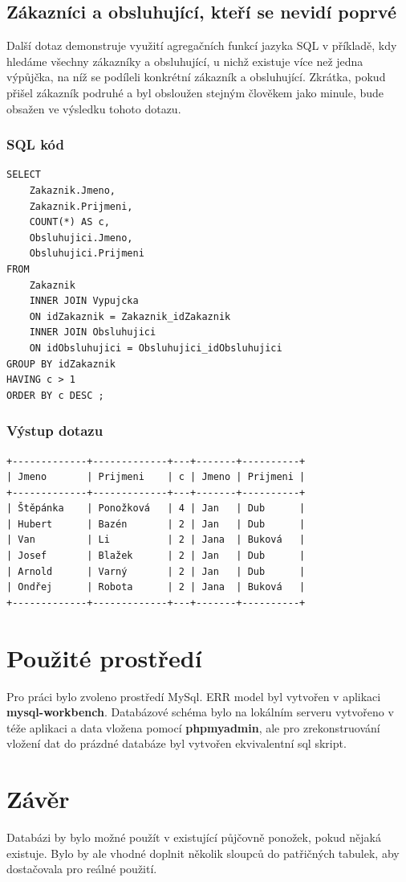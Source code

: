 \documentclass[titlepage]{article}
\begin{document}
\subsection{Zákazníci a obsluhující, kteří se nevidí poprvé}
Další dotaz demonstruje využití agregačních funkcí jazyka SQL v příkladě, kdy
hledáme všechny zákazníky a obsluhující, u nichž existuje více než jedna
výpůjčka, na níž se podíleli konkrétní zákazník a obsluhující. Zkrátka, pokud
přišel zákazník podruhé a byl obsloužen stejným člověkem jako minule, bude
obsažen ve výsledku tohoto dotazu.

\subsubsection{SQL kód}
\begin{verbatim}
SELECT 
	Zakaznik.Jmeno, 
	Zakaznik.Prijmeni, 
	COUNT(*) AS c, 
	Obsluhujici.Jmeno, 
	Obsluhujici.Prijmeni 
FROM 
	Zakaznik 
	INNER JOIN Vypujcka 
	ON idZakaznik = Zakaznik_idZakaznik 
	INNER JOIN Obsluhujici 
	ON idObsluhujici = Obsluhujici_idObsluhujici 
GROUP BY idZakaznik 
HAVING c > 1
ORDER BY c DESC ;
\end{verbatim}

\subsubsection{Výstup dotazu}
\begin{verbatim}
+-------------+-------------+---+-------+----------+
| Jmeno       | Prijmeni    | c | Jmeno | Prijmeni |
+-------------+-------------+---+-------+----------+
| Štěpánka    | Ponožková   | 4 | Jan   | Dub      |
| Hubert      | Bazén       | 2 | Jan   | Dub      |
| Van         | Li          | 2 | Jana  | Buková   |
| Josef       | Blažek      | 2 | Jan   | Dub      |
| Arnold      | Varný       | 2 | Jan   | Dub      |
| Ondřej      | Robota      | 2 | Jana  | Buková   |
+-------------+-------------+---+-------+----------+
\end{verbatim}


\clearpage
\section{Použité prostředí}
Pro práci bylo zvoleno prostředí MySql. ERR model byl vytvořen v aplikaci {\bf
mysql-workbench}. Databázové schéma bylo na lokálním serveru vytvořeno v téže
aplikaci a data vložena pomocí {\bf phpmyadmin}, ale pro zrekonstruování
vložení dat do prázdné databáze byl vytvořen ekvivalentní sql skript.

\section{Závěr}
Databázi by bylo možné použít v existující půjčovně ponožek, pokud nějaká
existuje. Bylo by ale vhodné doplnit několik sloupců do patřičných tabulek, aby
dostačovala pro reálné použití.
\end{document}
